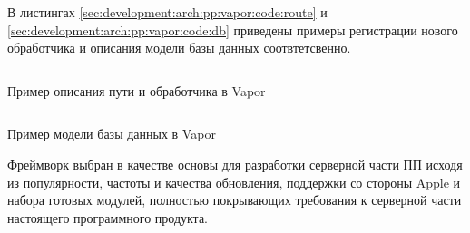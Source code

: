 В листингах \ref{sec:development:arch:pp:vapor:code:route} и \ref{sec:development:arch:pp:vapor:code:db} приведены примеры регистрации нового обработчика и описания модели базы данных соотвтетсвенно.

\begin{code}
	\inputminted{swift}{inc/src/vapor_route.swift}
   \caption{Пример описания пути и обработчика в Vapor}
   \label{sec:development:arch:pp:vapor:code:route}
\end{code}

\begin{code}
	\inputminted{swift}{inc/src/vapor_db.swift}
   \caption{Пример модели базы данных в Vapor}
   \label{sec:development:arch:pp:vapor:code:db}
\end{code}

Фреймворк выбран в качестве основы для разработки серверной части ПП исходя из популярности, частоты и качества обновления, поддержки со стороны Apple и набора готовых модулей, полностью покрывающих требования к серверной части настоящего программного продукта.